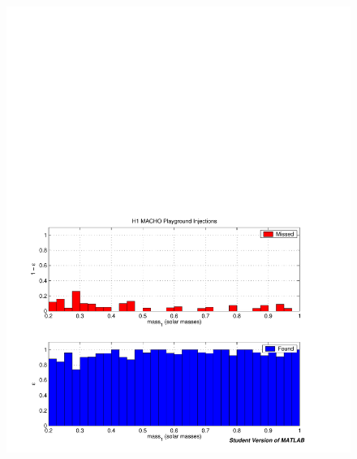 \begin{figure}[p]
\begin{center}
\includegraphics[width=\textwidth]{analysis/figures/msun_eff} \\

\end{center}
\end{figure}
